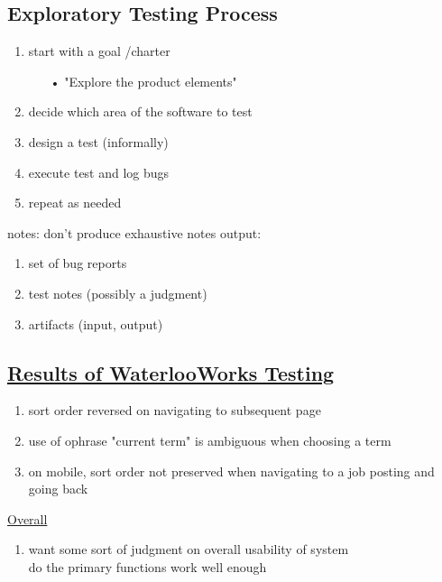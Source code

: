 \documentclass[10pt,usletter]{article}
\newcommand{\tab}[1][1cm]{\hspace*{#1}}
\begin{document}
\subsection*{Exploratory Testing Process}
\begin{enumerate}
\item start with a goal /charter
\begin{enumerate}
\item[•]"Explore the product elements"
\end{enumerate}
\item decide which area of the software to test
\item design a test (informally)
\item execute test and log bugs
\item repeat as needed
\end{enumerate}
notes: don't produce exhaustive notes
output: \begin{enumerate}
\item set of bug reports
\item test notes (possibly a judgment)
\item artifacts (input, output)
\end{enumerate}
\subsection*{\underline{Results of WaterlooWorks Testing}}
\begin{enumerate}
\item sort order reversed on navigating to subsequent page
\item use of ophrase "current term" is ambiguous when choosing a term
\item on mobile, sort order not preserved when navigating to a job posting and going back
\end{enumerate}
\underline{Overall}
\begin{enumerate}
\item want some sort of judgment on overall usability of system\\
\tab do the primary functions work well enough
\end{enumerate}
\end{document}
